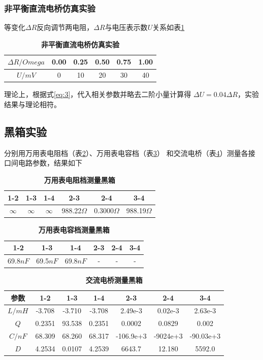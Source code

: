 \documentclass[10pt,a4paper,twocolumn,twoside,UTF8]{ctexart}
\begin{document}
		\subsubsection{非平衡直流电桥仿真实验}
			等变化$\Delta R$反向调节两电阻，$\Delta R$与电压表示数$U$关系如表\ref{tab:3}
			\begin{table}[htbp]
				\centering
					\begin{tabular}{cccccc}
						\toprule
						$\Delta R /Omega$	&0.00	&0.25	&0.50	&0.75	&1.00 	\\
						\midrule
						$U /mV$				&0 		&10		&20 	&30 	&40		\\
						\bottomrule
					\end{tabular}
					\caption{\textbf{非平衡直流电桥仿真实验}}
					\label{tab:3}
			\end{table}
			
			理论上，根据式\ref{eq:3}，代入相关参数并略去二阶小量计算得
			$\Delta U = 0.04 \Delta R$，实验结果与理论相符。
	\subsection{黑箱实验}
		分别用万用表电阻档（表\ref{tab:4.1}）、万用表电容档（表\ref{tab:4.2}）
		和交流电桥（表\ref{tab:4.3}）测量各接口间电路参数，结果如下
		\begin{table}[htbp]
			\centering
				\begin{tabular}{cccccc}
					\toprule
					1-2	&1-3	&1-4	&2-3	&2-4	&3-4 	\\
					\midrule
					$\infty$	&$\infty$ 	&$\infty$	&988.22$\Omega$ 	&0.3000$\Omega$ 	&988.19$\Omega$	\\
					\bottomrule
				\end{tabular}
				\caption{\textbf{万用表电阻档测量黑箱}}
				\label{tab:4.1}
		\end{table}
		\begin{table}[htbp]
			\centering
				\begin{tabular}{cccccc}
					\toprule
					1-2	&1-3	&1-4	&2-3	&2-4	&3-4 	\\
					\midrule
					69.8$nF$	&69.5$nF$ 		&69.8$nF$		&- 	&- 	&-		\\
					\bottomrule
				\end{tabular}
				\caption{\textbf{万用表电容档测量黑箱}}
				\label{tab:4.2}
		\end{table}
		\begin{table}[htbp]
			\centering
				\begin{tabular}{ccccccc}
					\toprule
					参数	&1-2	&1-3	&1-4	&2-3	&2-4	&3-4 	\\
					\midrule
					$L /mH$	&-3.708 &-3.710	&-3.708	&2.49e-3 	&0.02e-3	&2.63e-3	\\
					$Q$	&0.2351 &93.538	&0.2351 &0.0002	&0.0829 &0.002	\\
					$C /nF$	&68.309 &68.260	&68.317	 &-106.9e+3	&-9024e+3	&-90.03e+3 \\
					$D$	&4.2534 &0.0107	&4.2539	 &6643.7	&12.180	&5592.0 \\
					\bottomrule
				\end{tabular}
				\caption{\textbf{交流电桥测量黑箱}}
				\label{tab:4.3}
		\end{table}
\end{document}
